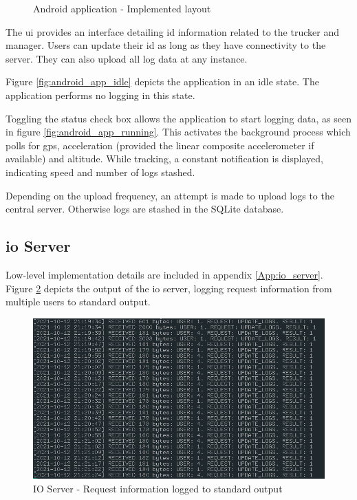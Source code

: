 \begin{figure}[H]
{        \label{fig:android_app_stashing}
    }
\caption{Android application - Implemented layout}
\label{fig:android_app_implementation}
\end{figure}

The \ac{ui} provides an interface detailing \ac{id} information related to the trucker and manager.
Users can update their \ac{id} as long as they have connectivity to the server.
They can also upload all log data at any instance.

Figure \ref{fig:android_app_idle} depicts the application in an idle state.
The application performs no logging in this state.

Toggling the status check box allows the application to start logging data, as seen in figure \ref{fig:android_app_running}.
This activates the background process which polls for \ac{gps}, acceleration (provided the linear composite accelerometer if available) and altitude.
While tracking, a constant notification is displayed, indicating speed and number of logs stashed.

Depending on the upload frequency, an attempt is made to upload logs to the central server.
Otherwise logs are stashed in the SQLite database.

\subsection{\Ac{io} Server}
Low-level implementation details are included in appendix \ref{App:io_server}.
Figure \ref{fig:io_output} depicts the output of the \ac{io} server, logging request information from multiple users to standard output.

\begin{figure}[H]
\centering
\includegraphics[scale=0.60]{io_output.png}
\caption{IO Server - Request information logged to standard output}
\label{fig:io_output}
\end{figure}

